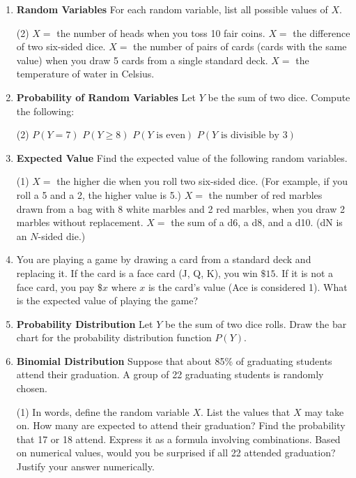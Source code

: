 \begin{enumerate}
\item \textbf{Random Variables} For each random variable, list all possible values of $X$.
\begin{tasks}[after-skip = 25pt, after-item-skip=25pt](2)
\task $X = $ the number of heads when you toss 10 fair coins.
\task $X = $ the difference of two six-sided dice.
\task $X = $ the number of pairs of cards (cards with the same value) when you draw 5 cards from a single standard deck.
\task $X = $ the temperature of water in Celsius.
\end{tasks}
 
\item \textbf{Probability of Random Variables} Let $Y$ be the sum of two dice. Compute the following:
\begin{tasks}[after-skip = 25pt, after-item-skip=25pt](2)
\task $P(Y = 7)$
\task $P(Y \geq 8)$
\task $P(Y \mbox{ is even})$
\task $P(Y \mbox{ is divisible by 3})$
\end{tasks}
 
\item \textbf{Expected Value} Find the expected value of the following random variables.
\begin{tasks}[after-skip = 30pt, after-item-skip=30pt](1)
\task $X=$ the higher die when you roll two six-sided dice. (For example, if you roll a 5 and a 2, the higher value is 5.)
\task $X=$ the number of red marbles drawn from a bag with 8 white marbles and 2 red marbles, when you draw 2 marbles without replacement.
\task $X=$ the sum of a d6, a d8, and a d10. (dN is an $N$-sided die.)
\end{tasks}

\item You are playing a game by drawing a card from a standard deck and replacing it. If the card is a face card (J, Q, K), you win $\$15$. If it is not a face card, you pay $\$x$ where $x$ is the card's value (Ace is considered 1). What is the expected value of playing the game?

\newpage

\item \textbf{Probability Distribution}
Let $Y$ be the sum of two dice rolls. Draw the bar chart for the probability distribution function $P(Y)$.

\vspace{50pt}

\item \textbf{Binomial Distribution} Suppose that about 85\% of graduating students attend their graduation. A group of 22 graduating students is randomly chosen.
\begin{tasks}[after-skip = 20pt, after-item-skip=15pt](1)
\task In words, define the random variable $X$.
\task List the values that $X$ may take on.
\task How many are expected to attend their graduation?
\task Find the probability that 17 or 18 attend. Express it as a formula involving combinations.
\task Based on numerical values, would you be surprised if all 22 attended graduation? Justify your answer numerically.
\end{tasks}


\end{enumerate}
